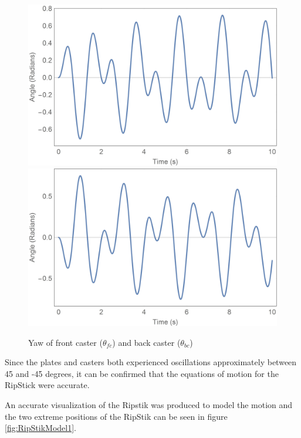 \begin{figure}[!htb]
	\centering
	\includegraphics[width=\linewidth]{thetafc}
	\endminipage\hspace{1em}%
	\includegraphics[width=\linewidth]{thetabc}
	\endminipage
	\caption{Yaw of front caster ($\theta_{fc}$) and back caster ($\theta_{bc}$)}
	\label{fig:casters}
\end{figure}

Since the plates and casters both experienced oscillations approximately between 45 and -45 degrees, it can be confirmed that the equations of motion for the RipStick were accurate.

An accurate visualization of the Ripstik was produced to model the motion and the two extreme positions of the RipStik can be seen in figure \ref{fig:RipStikModel1}.

